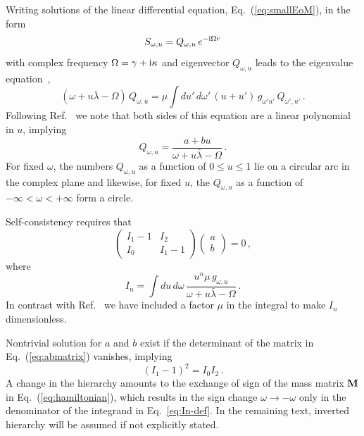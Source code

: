 \documentclass[twocolumn,prd,showpacs,
floatfix,preprintnumbers,nofootinbib]{revtex4}
\begin{document}
Writing solutions of the linear differential equation,
Eq.~(\ref{eq:smallEoM}), in the form
\begin{equation}
S_{\omega,u}=Q_{\omega,u}\,e^{-{\rm i}\Omega r}
\end{equation}
with complex frequency $\Omega=\gamma+{\rm i}\kappa$ and eigenvector
$Q_{\omega,u}$ leads to the eigenvalue
equation~\cite{Banerjee:2011fj},
\begin{equation}\label{fourier-eom}
(\omega + u\bar\lambda - \Omega)\, Q_{\omega,u}=
\mu \int du'\,d\omega'\,(u+u')\,g_{\omega'u'}\,Q_{\omega',u'}\,.
\end{equation}
Following Ref.~\cite{Banerjee:2011fj} we note that both sides of
this equation are a linear polynomial in $u$, implying
\begin{equation}
Q_{\omega,u}=\frac{a+bu}{\omega+u\bar\lambda-\Omega}\,.
\end{equation}
For fixed $\omega$, the numbers $Q_{\omega,u}$ as a function of
$0\leq u\leq1$ lie on a circular arc in the complex plane and
likewise, for fixed $u$, the $Q_{\omega,u}$ as a function of
$-\infty<\omega<+\infty$ form a circle. 

Self-consistency requires that
\begin{equation}\label{eq:abmatrix}
\begin{pmatrix} I_1-1&I_2\\ I_0&I_1-1\end{pmatrix}
\begin{pmatrix} a\\ b\end{pmatrix}=0\,,
\end{equation}
where
\begin{equation}
I_n=\int du\,d\omega\,
\frac{u^n\mu\,g_{\omega,u}}{\omega+u\bar\lambda-\Omega}\,.
\label{eq:In-def}
\end{equation}
In contrast with Ref.~\cite{Banerjee:2011fj} we have included a
factor $\mu$ in the integral to make $I_n$ dimensionless.

Nontrivial solution for $a$ and $b$ exist if the determinant of the
matrix in Eq.~(\ref{eq:abmatrix}) vanishes, implying
\begin{equation}\label{eq:multiangleeigenvalue}
(I_1-1)^2=I_0 I_2\, .
\end{equation}
A change in the hierarchy amounts to the exchange of sign of the mass matrix  $\bf M$ in 
Eq.~(\ref{eq:hamiltonian}), which results in the sign change 
$\omega\to-\omega$ only in the denominator of the integrand in 
Eq.~\ref{eq:In-def}. In the remaining text, inverted hierarchy will be 
assumed if not explicitly stated.
\end{document}
